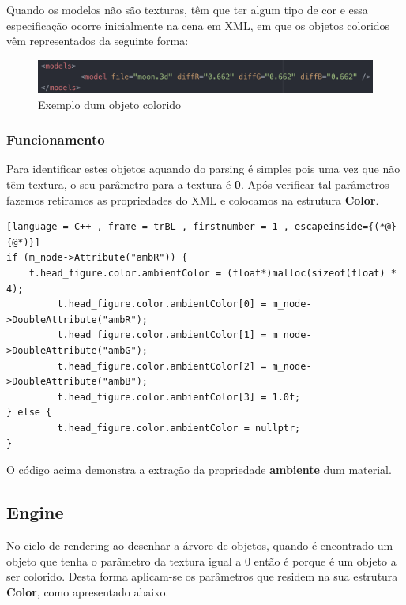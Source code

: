 \documentclass[a4paper]{article}
\begin{document}
Quando os modelos não são texturas, têm que ter algum tipo de cor e essa especificação ocorre inicialmente na cena em XML, em que os objetos coloridos vêm representados da seguinte forma:

\begin{figure}[H]
\centering
\includegraphics[scale=0.6]{materiais_xml.png}
\caption{Exemplo dum objeto colorido}
\label{img:obj_colorido}
\end{figure}

\subsubsection{Funcionamento}
\label{sec:funcionamentot}

Para identificar estes objetos aquando do parsing é simples pois uma vez que não têm textura, o seu parâmetro para a textura é \textbf{0}. Após verificar tal parâmetros fazemos retiramos as propriedades do XML e colocamos na estrutura \textbf{Color}.

\begin{lstlisting}[language = C++ , frame = trBL , firstnumber = 1 , escapeinside={(*@}{@*)}]
if (m_node->Attribute("ambR")) {
	t.head_figure.color.ambientColor = (float*)malloc(sizeof(float) * 4);
         t.head_figure.color.ambientColor[0] = m_node->DoubleAttribute("ambR");
         t.head_figure.color.ambientColor[1] = m_node->DoubleAttribute("ambG");
         t.head_figure.color.ambientColor[2] = m_node->DoubleAttribute("ambB");
         t.head_figure.color.ambientColor[3] = 1.0f;
} else {
         t.head_figure.color.ambientColor = nullptr;
}
\end{lstlisting}

O código acima demonstra a extração da propriedade \textbf{ambiente} dum material.

\newpage
\subsection{Engine}
\label{sec:enginet}

No ciclo de rendering ao desenhar a árvore de objetos, quando é encontrado um objeto que tenha o parâmetro da textura igual a 0 então é porque é um objeto a ser colorido. Desta forma aplicam-se os parâmetros que residem na sua estrutura \textbf{Color}, como apresentado abaixo.
\end{document}

